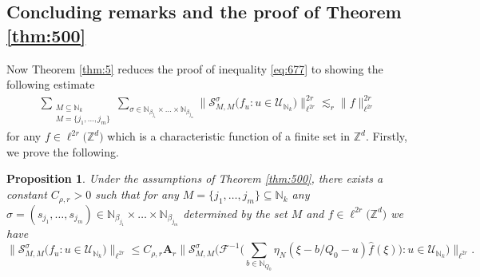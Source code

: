 \documentclass[a4paper,oneside]{amsart}
\theoremstyle{plain}
\newtheorem{proposition}{Proposition}[section]
\theoremstyle{definition}
\numberwithin{equation}{section}
\newcounter{thm}
\theoremstyle{plain}
\newcommand{\ZZ}{\mathbb{Z}}
\newcommand{\NN}{\mathbb{N}}
\renewcommand{\atop}[2]{\substack{{#1}\\{#2}}}
\newcommand{\8}{\infty}
\begin{document}
\subsection{Concluding remarks and the proof of Theorem \ref{thm:500}}
Now Theorem \ref{thm:5} reduces the proof of inequality \eqref{eq:677}
to showing the following estimate 
\begin{align}
  \label{eq:134}
\sum_{\atop{M\subseteq \NN_k}{M=\{j_1, \ldots,
    j_m\}}}\sum_{\sigma\in\NN_{\beta_{j_1}}\times\ldots\times\NN_{\beta_{j_m}}}
\big\|\mathcal S_{M, M}^{\sigma}\big(f_u:u\in\mathcal
  U_{\NN_k}\big)\big\|_{\ell^{2r}}^{2r}\lesssim_r\|f\|_{\ell^{2r}}^{2r}
\end{align}
for any
$f\in\ell^{2r}\big(\ZZ^d\big)$ which is a
characteristic function of a finite set in $\ZZ^d$.
Firstly, we prove the following.
\begin{proposition}
  \label{prop:5}
Under the assumptions of Theorem \ref{thm:500}, 
there exists a constant $C_{\rho, r}>0$
  such that for any $M=\{j_1,\ldots, j_m\}\subseteq\NN_{k}$ any $\sigma=(s_{j_1},\ldots,
s_{j_m})\in\NN_{\beta_{j_1}}\times\ldots\times\NN_{\beta_{j_m}}$
determined by the set $M$ and $f\in\ell^{2r}\big(\ZZ^d\big)$ we
have
\begin{equation}
  \label{eq:138}
  \big\|\mathcal S_{M,
    M}^{\sigma}\big(f_u:u\in\mathcal
  U_{\NN_k}\big)\big\|_{\ell^{2r}}
\le C_{\rho, r} \mathbf A_r \Big\|\mathcal S_{M,
    M}^{\sigma}\Big(\mathcal
  F^{-1}\Big(\sum_{b\in\NN_{Q_0}}\eta_N(\xi-b/Q_0-u)\hat{f}(\xi)\Big):u\in\mathcal
  U_{\NN_k}\Big)\Big\|_{\ell^{2r}}.
\end{equation}
\end{proposition}
\end{document}
